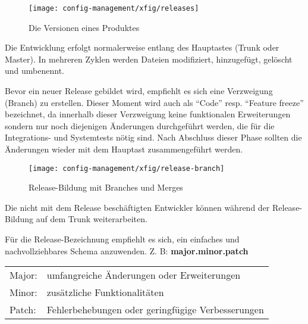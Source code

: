 \fi
\begin{figure}[H]
\begin{center}
\texttt{[image: config-management/xfig/releases]}
\end{center}
\caption{Die Versionen eines Produktes}
\end{figure}
\newslide

Die Entwicklung erfolgt normalerweise entlang des Hauptastes
(Trunk oder Master). In mehreren Zyklen werden Dateien modifiziert,
hinzugefügt, gelöscht und umbenennt.

Bevor ein neuer Release gebildet wird, empfiehlt es sich
eine Verzweigung (Branch) zu erstellen. Dieser Moment wird auch als
``Code'' resp. ``Feature freeze'' bezeichnet, da innerhalb dieser Verzweigung
keine funktionalen Erweiterungen sondern nur noch diejenigen
Änderungen durchgeführt werden, die für die Integrations- und
Systemtests nötig sind. Nach Abschluss dieser Phase sollten die
Änderungen wieder mit dem Hauptast zusammengeführt werden.
\begin{figure}[H]
\begin{center}
  \texttt{[image: config-management/xfig/release-branch]}
\end{center}
\caption{Release-Bildung mit Branches und Merges}
\end{figure}
Die nicht mit dem Release beschäftigten Entwickler können während der
Release-Bildung auf dem Trunk weiterarbeiten.

\newslide
Für die Release-Bezeichnung empfiehlt es sich, ein einfaches und
nachvollziehbares Schema
anzuwenden. Z. B: {\bfseries major.minor.patch}

\begin{tabular}{ll}
Major: & umfangreiche Änderungen oder Erweiterungen\\
Minor: & zusätzliche Funktionalitäten\\
Patch: & Fehlerbehebungen oder geringfügige Verbesserungen\\
\end{tabular}

\newpage
